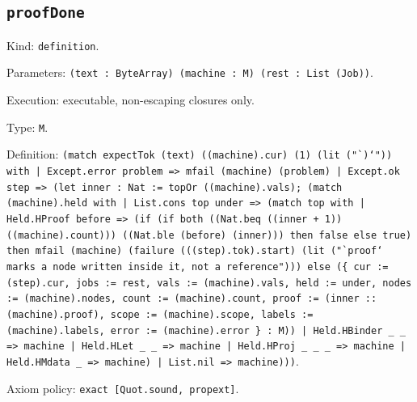 \documentclass[11pt]{article}
\begin{document}
\subsection*{\texttt{proofDone}}
\noindent Kind: \texttt{definition}.\par
\noindent Parameters: \texttt{(text : ByteArray) (machine : M) (rest : List (Job))}.\par
\noindent Execution: executable, non-escaping closures only.\par
\noindent Type: \texttt{M}.\par
\noindent Definition: \texttt{(match expectTok (text) ((machine).cur) (1) (lit ("`)`")) with | Except.error problem => mfail (machine) (problem) | Except.ok step => (let inner : Nat := topOr ((machine).vals); (match (machine).held with | List.cons top under => (match top with | Held.HProof before => (if (if both ((Nat.beq ((inner + 1)) ((machine).count))) ((Nat.ble (before) (inner))) then false else true) then mfail (machine) (failure (((step).tok).start) (lit ("`proof` marks a node written inside it, not a reference"))) else (\{ cur := (step).cur, jobs := rest, vals := (machine).vals, held := under, nodes := (machine).nodes, count := (machine).count, proof := (inner :: (machine).proof), scope := (machine).scope, labels := (machine).labels, error := (machine).error \} : M)) | Held.HBinder \_ \_ => machine | Held.HLet \_ \_ => machine | Held.HProj \_ \_ \_ => machine | Held.HMdata \_ => machine) | List.nil => machine)))}.\par
\noindent Axiom policy: \texttt{exact [Quot.sound, propext]}.\par
\end{document}
